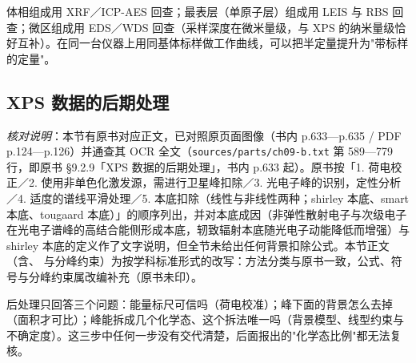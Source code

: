 \begin{crosscheck}
体相组成用 XRF／ICP-AES 回查；最表层（单原子层）组成用 LEIS 与 RBS 回查；微区组成用 EDS／WDS 回查（采样深度在微米量级，与 XPS 的纳米量级恰好互补）。在同一台仪器上用同基体标样做工作曲线，可以把半定量提升为"带标样的定量"。
\end{crosscheck}

\subsection{XPS 数据的后期处理}
\label{sec:ch09-postproc}

\emph{核对说明}：本节有原书对应正文，已对照原页面图像（书内 p.633—p.635 / PDF p.124—p.126）并通查其 OCR 全文（\texttt{sources/parts/ch09-b.txt} 第 589—779 行，即原书 §9.2.9「XPS 数据的后期处理」，书内 p.633 起）。原书按「1. 荷电校正／2. 使用非单色化激发源，需进行卫星峰扣除／3. 光电子峰的识别，定性分析／4. 适度的谱线平滑处理／5. 本底扣除（线性与非线性两种；shirley 本底、smart 本底、tougaard 本底）」的顺序列出，并对本底成因（非弹性散射电子与次级电子在光电子谱峰的高结合能侧形成本底，轫致辐射本底随光电子动能降低而增强）与 shirley 本底的定义作了文字说明，但全节未给出任何背景扣除公式。本节正文（含、 与分峰约束）为按学科标准形式的改写：方法分类与原书一致，公式、符号与分峰约束属改编补充（原书未印）。

\begin{probout}
后处理只回答三个问题：能量标尺可信吗（荷电校准）；峰下面的背景怎么去掉（面积才可比）；峰能拆成几个化学态、这个拆法唯一吗（背景模型、线型约束与不确定度）。这三步中任何一步没有交代清楚，后面报出的"化学态比例"都无法复核。
\end{probout}

